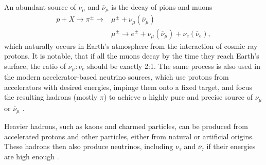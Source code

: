 
An abundant source of $\nu_\mu$ and $\overline{\nu}_\mu$ is the decay of pions and muons
\begin{align}
p+X \rightarrow \pi^\pm \rightarrow &\mu^\pm + \nu_\mu\left(\overline{\nu}_\mu\right) \\
 & \mu^\pm \rightarrow e^\pm + \nu_\mu\left(\overline{\nu}_\mu\right) + \nu_e\left(\overline{\nu}_e\right),
\end{align}
which naturally occurs in Earth's atmosphere from the interaction of cosmic ray protons. It is notable, that if all the muons decay by the time they reach Earth's surface, the ratio of $\nu_\mu : \nu_e$ should be exactly 2:1. The same process is also used in the modern accelerator-based neutrino sources, which use protons from accelerators with desired energies, impinge them onto a fixed target, and focus the resulting hadrons (mostly $\pi$) to achieve a highly pure and precise source of $\nu_\mu$ or $\overline{\nu}_\mu$ \cite{GoodmanAdvancesInNeutrinoPhysics.pdf, SchwartzAccelerators.pdf}.

Heavier hadrons, such as kaons and charmed particles, can be produced from accelerated protons and other particles, either from natural or artificial origins. These hadrons then also produce neutrinos, including $\nu_\tau$ and $\overline{\nu}_\tau$ if their energies are high enough \cite{ObservationOfTauNeutrino.pdf, FinalTauNeutrinoResultsDONUT2008.pdf}.


